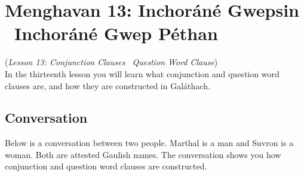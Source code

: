\section{Menghavan 13: Inchor\'{a}n\'{e} Gwepsin \textendash\ Inchor\'{a}n\'{e} Gwep P\'{e}than}
(\textit{Lesson 13: Conjunction Clauses \textendash\ Question Word Clause})\\

In the thirteenth lesson you will learn what conjunction and question word clauses are, and how they are constructed in Gal\'{a}thach.

\subsection{Conversation}

Below is a conversation between two people. Marthal is a man and Suvron is a woman. Both are attested Gaulish names. The conversation shows you how conjunction and question word clauses are constructed.


